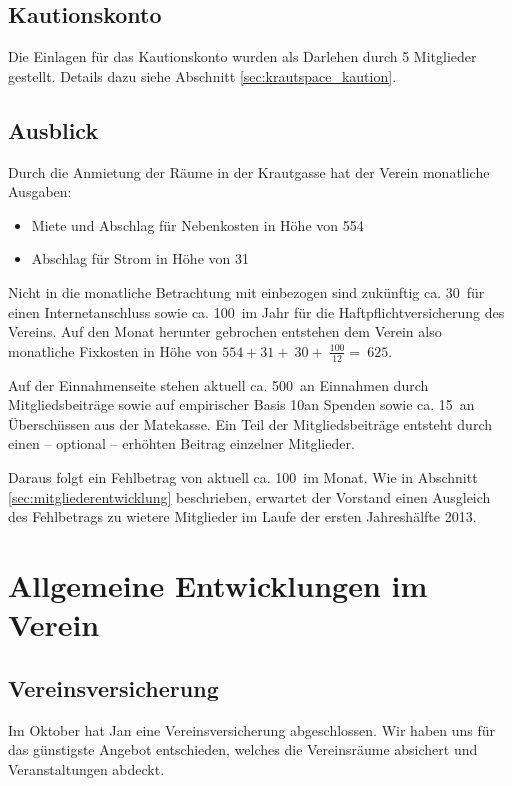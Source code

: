\documentclass[10pt,DIV16]{scrartcl}
\begin{document}
\subsection{Kautionskonto}

Die Einlagen für das Kautionskonto wurden als Darlehen durch 5 
Mitglieder gestellt. Details dazu siehe Abschnitt 
\ref{sec:krautspace_kaution}.

\subsection{Ausblick} 

Durch die Anmietung der Räume in der Krautgasse hat der Verein 
monatliche Ausgaben: 

\begin{itemize}
	\item Miete und Abschlag für Nebenkosten in Höhe von 554\EUR{}
	\item Abschlag für Strom in Höhe von 31\EUR{}
\end{itemize}

Nicht in die monatliche Betrachtung mit einbezogen sind zukünftig 
ca. 30\EUR\ für einen Internetanschluss sowie ca. 100\EUR\ im Jahr 
für die Haftpflichtversicherung des Vereins. Auf den Monat herunter 
gebrochen entstehen dem Verein also monatliche Fixkosten in Höhe von 
$554 + 31 + ~30+ ~\frac{100}{12} = ~625$\EUR. 

Auf der Einnahmenseite stehen aktuell ca. 500\EUR\ an Einnahmen 
durch Mitgliedsbeiträge sowie auf empirischer Basis 10\EUR an 
Spenden sowie ca. 15\EUR\ an Überschüssen aus der Matekasse. Ein 
Teil der Mitgliedsbeiträge entsteht durch einen -- optional -- 
erhöhten Beitrag einzelner Mitglieder. 

Daraus folgt ein Fehlbetrag von aktuell ca. 100\EUR\ im Monat. Wie 
in Abschnitt \ref{sec:mitgliederentwicklung} beschrieben, erwartet 
der Vorstand einen Ausgleich des Fehlbetrags zu wietere Mitglieder 
im Laufe der ersten Jahreshälfte 2013. 

\section{Allgemeine Entwicklungen im Verein}

\subsection{Vereinsversicherung}

Im Oktober hat Jan eine Vereinsversicherung abgeschlossen.  Wir haben uns für
das günstigste Angebot entschieden, welches die Vereinsräume absichert und
Veranstaltungen abdeckt.
\end{document}
